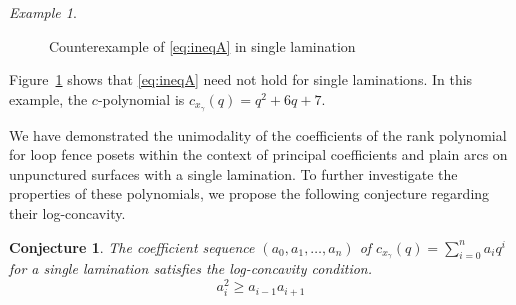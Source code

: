 \documentclass{article}
\newtheorem{conjecture}{Conjecture}
\theoremstyle{remark}
\newtheorem{example}{Example}
\begin{document}
\begin{example}
\begin{figure}[H]
    \centering
{}

    \caption{Counterexample of \eqref{eq:ineqA} in single lamination}
    \label{fig:ineqasin}
\end{figure}

Figure~\ref{fig:ineqasin} shows that \eqref{eq:ineqA} need not hold for single laminations. In this example, the $c$-polynomial is $c_{x_\gamma}(q) = q^{2} + 6q + 7$.

\end{example}

We have demonstrated the unimodality of the coefficients of the rank polynomial for loop fence posets within the context of principal coefficients and plain arcs on unpunctured surfaces with a single lamination. To further investigate the properties of these polynomials, we propose the following conjecture regarding their log-concavity.

\begin{conjecture} \label{conj:log-concavity}
The coefficient sequence $(a_0, a_1, \ldots, a_n)$ of $c_{x_\gamma}(q) = \sum_{i=0}^n a_i q^i$ for a single lamination satisfies the log-concavity condition. 
\[
a_i^2 \geq a_{i-1} a_{i+1}
\]
\end{conjecture}
\end{document}
